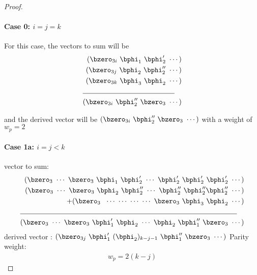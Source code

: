 \documentclass[11pt, oneside, dvipdfmx]{book}
\begin{document}
\begin{proof}
\paragraph{Case 0: $i=j=k$ \newline}

 For this case, the vectors to sum will be 
 \begin{align*}
(\bzero_{3i}~\bphi_1~\bphi'_2~\cdots)\\
(\bzero_{3j}~\bphi_2~\bphi''_2~\cdots)\\
(\bzero_{3k}~\bphi_3~\bphi_2~\cdots)\\
\cline{1-2}
(\bzero_{3i}~\bphi''_2~\bzero_{3}~\cdots)
\end{align*}
 
and  the derived vector will be $(\bzero_{3i}~\bphi''_2~\bzero_{3}~\cdots)$ with a weight of $w_p=2$
 
 
 \paragraph{Case 1a: $i=j<k$\newline}
 vector to sum:
 \begin{align*}
 (\bzero_{3}~\cdots~\bzero_{3}~\bphi_1~\bphi'_2~\cdots~\bphi_2'~\bphi_2'~\bphi_2'~\cdots)\\
 (\bzero_{3}~\cdots~\bzero_{3}~\bphi_2~\bphi''_2~\cdots~\bphi''_2~\bphi''_2\bphi''_2~\cdots)\\
+(\bzero_{3}~~\cdots~\cdots~\cdots~\cdots~\bzero_{3}~\bphi_3~\bphi_2~\cdots)\\
\cline{1-2}
(\bzero_{3}~\cdots~\bzero_{3}~\bphi'_1~\bphi_2~\cdots~\bphi_2~\bphi''_1~\bzero_3~\cdots)
\end{align*}
derived vector : $(\bzero_{3j}~\bphi'_1~(\bphi_2)_{k-j-1}~\bphi''_1~\bzero_3~\cdots)$
\newline
Parity weight: \begin{equation}
\begin{split}
w_p=2(k-j)
\end{split}
\end{equation}


\end{proof}
\end{document}
